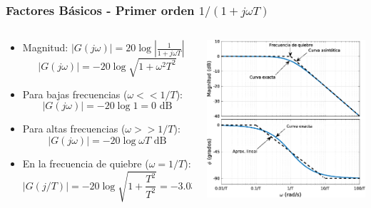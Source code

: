 \documentclass[aspectratio=169]{beamer}
\theoremstyle{definition}
\theoremstyle{plain}
\theoremstyle{remark}
\begin{document}
\begin{frame}[<+->]\frametitle{Factores Básicos - Primer orden $1/(1+j \omega T)$}
\begin{columns}
	\begin{column}{0.5\textwidth}
	\small
	\begin{itemize}
		\item Magnitud: $\left| G(j\omega) \right| = 20 \log \left| \frac{1}{1+j\omega T} \right|$
		\begin{equation*}
			\left| G(j\omega) \right| = -20 \log \sqrt{1+\omega^2 T^2}
		\end{equation*}
		\item Para bajas frecuencias ($\omega << 1/T$):
		\begin{equation*}
			\left| G(j\omega) \right| = -20 \log 1 = 0 \text{ dB}
		\end{equation*}
		\item Para altas frecuencias ($\omega >> 1/T$):
		\begin{equation*}
			\left| G(j\omega) \right| = -20 \log \omega T \text{ dB}
		\end{equation*}
		\item En la frecuencia de quiebre ($\omega = 1/T$):
		\begin{equation*}
			\left| G(j/T) \right| = - 20\log \sqrt{1 + \frac{T^2}{T^2}} = -3.03 \text{ dB}
		\end{equation*}
	\end{itemize}
	\end{column}
	\begin{column}{0.5\textwidth}
	\centering
	\includegraphics[width=6.5cm]{images/bodeFirstOrderIntegral.eps}
	\end{column}
\end{columns}
\end{frame}
\end{document}
